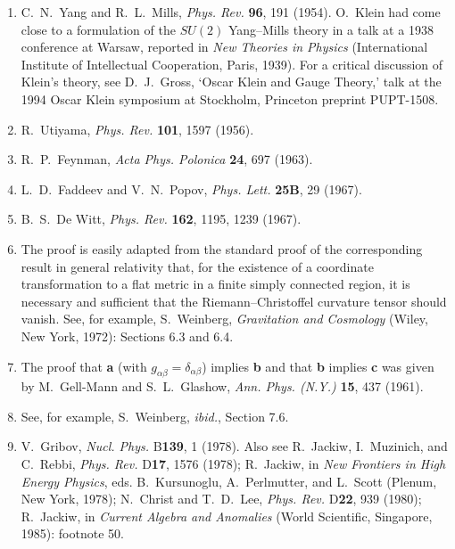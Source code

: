 \begin{enumerate}
  \item {}\label{ch15-ref-1}
  C.~N.~Yang and R.~L.~Mills, \textit{Phys. Rev.} \textbf{96}, 191 (1954). O.~Klein had come close to a formulation of the $SU(2)$ Yang--Mills theory in a talk at a 1938 conference at Warsaw, reported in \textit{New Theories in Physics} (International Institute of Intellectual Cooperation, Paris, 1939). For a critical discussion of Klein's theory, see D.~J.~Gross, `Oscar Klein and Gauge Theory,' talk at the 1994 Oscar Klein symposium at Stockholm, Princeton preprint PUPT-1508.

  \item {}\label{ch15-ref-2}
  R.~Utiyama, \textit{Phys. Rev.} \textbf{101}, 1597 (1956).

  \item {}\label{ch15-ref-3}
  R.~P.~Feynman, \textit{Acta Phys. Polonica} \textbf{24}, 697 (1963).

  \item {}\label{ch15-ref-4}
  L.~D.~Faddeev and V.~N.~Popov, \textit{Phys. Lett.} \textbf{25B}, 29 (1967).

  \item {}\label{ch15-ref-5}
  B.~S.~De Witt, \textit{Phys. Rev.} \textbf{162}, 1195, 1239 (1967).

  \item {}\label{ch15-ref-6}
  The proof is easily adapted from the standard proof of the corresponding result in general relativity that, for the existence of a coordinate transformation to a flat metric in a finite simply connected region, it is necessary and sufficient that the Riemann--Christoffel curvature tensor should vanish. See, for example, S.~Weinberg, \textit{Gravitation and Cosmology} (Wiley, New York, 1972): Sections 6.3 and 6.4.

  \item {}\label{ch15-ref-7}
  The proof that \textbf{a} (with $g_{\alpha\beta}=\delta_{\alpha\beta}$) implies \textbf{b} and that \textbf{b} implies \textbf{c} was given by M.~Gell-Mann and S.~L.~Glashow, \textit{Ann. Phys. (N.Y.)} \textbf{15}, 437 (1961).

  \item {}\label{ch15-ref-8}
  See, for example, S.~Weinberg, \textit{ibid.}, Section 7.6.

  \item {}\label{ch15-ref-9}
  V.~Gribov, \textit{Nucl. Phys.} B\textbf{139}, 1 (1978). Also see R.~Jackiw, I.~Muzinich, and C.~Rebbi, \textit{Phys. Rev.} D\textbf{17}, 1576 (1978); R.~Jackiw, in \textit{New Frontiers in High Energy Physics}, eds. B.~Kursunoglu, A.~Perlmutter, and L.~Scott (Plenum, New York, 1978); N.~Christ and T.~D.~Lee, \textit{Phys. Rev.} D\textbf{22}, 939 (1980); R.~Jackiw, in \textit{Current Algebra and Anomalies} (World Scientific, Singapore, 1985): footnote 50.


\end{enumerate}

